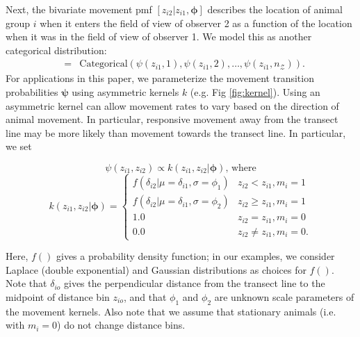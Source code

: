 \documentclass[aoas,preprint]{imsart}
\numberwithin{equation}{section}
\theoremstyle{plain}
\begin{document}
Next, the bivariate movement pmf $[z_{i2}|z_{i1},\boldsymbol{\phi}]$ describes the location of animal group $i$ when it enters the field of view of observer 2 as a function of the location when it was in the field of view of observer 1.  We model this as another categorical distribution:
\begin{eqnarray}
  [z_{i2}|z_{i1},\boldsymbol{\phi}] & = & \text{Categorical} \left( \psi(z_{i1},1),\psi(z_{i1},2),\hdots,\psi(z_{i1},n_\mathcal{Z}) \right).
  \label{eqn:move}
\end{eqnarray}
For applications in this paper, we parameterize the movement transition probabilities $\boldsymbol{\psi}$ using asymmetric kernels $k$ (e.g. Fig \ref{fig:kernel}).  Using an asymmetric kernel can allow movement rates to vary based on the direction of animal movement.  In particular, responsive movement away from the transect line may be more likely than movement towards the transect line. In particular, we set
\begin{linenomath*}
\begin{equation}
  \psi(z_{i1},z_{i2}) \propto k(z_{i1},z_{i2}|\boldsymbol{\phi}) \text{, where}
  \label{eq:psi}
\end{equation}
\begin{equation}
  k(z_{i1},z_{i2}|\boldsymbol{\phi}) = \left\{ \begin{array}{rl}
                                    f(\delta_{i2}|\mu=\delta_{i1},\sigma=\phi_1) & z_{i2}<z_{i1}, m_i = 1 \\
                                    f(\delta_{i2}|\mu=\delta_{i1},\sigma=\phi_2) & z_{i2} \ge z_{i1}, m_i = 1  \\
                                    1.0 & z_{i2}=z_{i1}, m_i=0 \\
                                    0.0 & z_{i2} \ne z_{i1}, m_i=0.
                                    \end{array} \right.
  \label{eq:g}
\end{equation}
\end{linenomath*}
Here, $f()$ gives a probability density function; in our examples, we consider Laplace (double exponential) and Gaussian distributions as choices for $f()$. Note that $\delta_{io}$ gives the perpendicular distance from the transect line to the midpoint of distance bin $z_{io}$, and that $\phi_1$ and $\phi_2$ are unknown scale parameters of the movement kernels.  Also note that we assume that stationary animals (i.e. with $m_i=0$) do not change distance bins.
\end{document}
